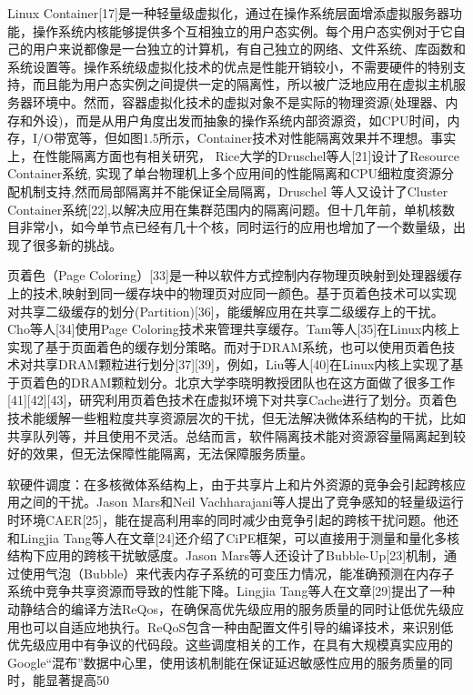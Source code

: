 Linux Container[17]是一种轻量级虚拟化，通过在操作系统层面增添虚拟服务器功能，操作系统内核能够提供多个互相独立的用户态实例。每个用户态实例对于它自己的用户来说都像是一台独立的计算机，有自己独立的网络、文件系统、库函数和系统设置等。操作系统级虚拟化技术的优点是性能开销较小，不需要硬件的特别支持，而且能为用户态实例之间提供一定的隔离性，所以被广泛地应用在虚拟主机服务器环境中。然而，容器虚拟化技术的虚拟对象不是实际的物理资源(处理器、内存和外设)，而是从用户角度出发而抽象的操作系统内部资源资，如CPU时间，内存，I/O带宽等，但如图1.5所示，Container技术对性能隔离效果并不理想。事实上，在性能隔离方面也有相关研究， Rice大学的Druschel等人[21]设计了Resource Container系统, 实现了单台物理机上多个应用间的性能隔离和CPU细粒度资源分配机制支持,然而局部隔离并不能保证全局隔离，Druschel 等人又设计了Cluster Container系统[22],以解决应用在集群范围内的隔离问题。但十几年前，单机核数目非常小，如今单节点已经有几十个核，同时运行的应用也增加了一个数量级，出现了很多新的挑战。

页着色（Page Coloring）[33]是一种以软件方式控制内存物理页映射到处理器缓存上的技术,映射到同一缓存块中的物理页对应同一颜色。基于页着色技术可以实现对共享二级缓存的划分(Partition)[36]，能缓解应用在共享二级缓存上的干扰。Cho等人[34]使用Page Coloring技术来管理共享缓存。Tam等人[35]在Linux内核上实现了基于页面着色的缓存划分策略。而对于DRAM系统，也可以使用页着色技术对共享DRAM颗粒进行划分[37][39]，例如，Liu等人[40]在Linux内核上实现了基于页着色的DRAM颗粒划分。北京大学李晓明教授团队也在这方面做了很多工作[41][42][43]，研究利用页着色技术在虚拟环境下对共享Cache进行了划分。页着色技术能缓解一些粗粒度共享资源层次的干扰，但无法解决微体系结构的干扰，比如共享队列等，并且使用不灵活。总结而言，软件隔离技术能对资源容量隔离起到较好的效果，但无法保障性能隔离，无法保障服务质量。

软硬件调度：在多核微体系结构上，由于共享片上和片外资源的竞争会引起跨核应用之间的干扰。Jason Mars和Neil Vachharajani等人提出了竞争感知的轻量级运行时环境CAER[25]，能在提高利用率的同时减少由竞争引起的跨核干扰问题。他还和Lingjia Tang等人在文章[24]还介绍了CiPE框架，可以直接用于测量和量化多核结构下应用的跨核干扰敏感度。Jason Mars等人还设计了Bubble-Up[23]机制，通过使用气泡（Bubble）来代表内存子系统的可变压力情况，能准确预测在内存子系统中竞争共享资源而导致的性能下降。Lingjia Tang等人在文章[29]提出了一种动静结合的编译方法ReQos，在确保高优先级应用的服务质量的同时让低优先级应用也可以自适应地执行。ReQoS包含一种由配置文件引导的编译技术，来识别低优先级应用中有争议的代码段。这些调度相关的工作，在具有大规模真实应用的Google“混布”数据中心里，使用该机制能在保证延迟敏感性应用的服务质量的同时，能显著提高50%

